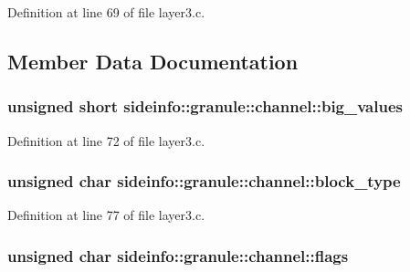 Definition at line 69 of file layer3.\+c.



\subsection{Member Data Documentation}
\subsubsection[{\texorpdfstring{big\+\_\+values}{big_values}}]{\setlength{\rightskip}{0pt plus 5cm}unsigned short sideinfo\+::granule\+::channel\+::big\+\_\+values}\hypertarget{structsideinfo_1_1granule_1_1channel_ae82ea84768517990506fca7f240236ce}{}\label{structsideinfo_1_1granule_1_1channel_ae82ea84768517990506fca7f240236ce}


Definition at line 72 of file layer3.\+c.

\subsubsection[{\texorpdfstring{block\+\_\+type}{block_type}}]{\setlength{\rightskip}{0pt plus 5cm}unsigned char sideinfo\+::granule\+::channel\+::block\+\_\+type}\hypertarget{structsideinfo_1_1granule_1_1channel_a02a0e1f29d5d9c51ebad223358cc5e92}{}\label{structsideinfo_1_1granule_1_1channel_a02a0e1f29d5d9c51ebad223358cc5e92}


Definition at line 77 of file layer3.\+c.

\subsubsection[{\texorpdfstring{flags}{flags}}]{\setlength{\rightskip}{0pt plus 5cm}unsigned char sideinfo\+::granule\+::channel\+::flags}\hypertarget{structsideinfo_1_1granule_1_1channel_a4042dc53877794c9847442f20250aa9c}{}\label{structsideinfo_1_1granule_1_1channel_a4042dc53877794c9847442f20250aa9c}


